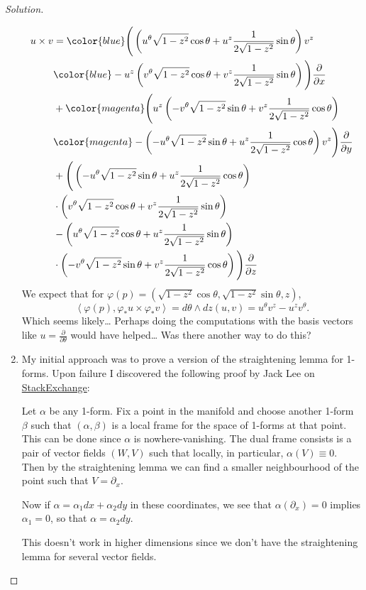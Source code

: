 \begin{proof}[Solution]
\begin{enumerate}[label=\alph*.]
\begin{align*}
				u\times v&={\color{blue}\Bigg(\left( u^\theta \sqrt{1-z^2} \cos \theta+u^z\frac{1}{2\sqrt{1-z^2} }\sin \theta \right)v^z}\\
					 &{\color{blue}-u^z\left( v^\theta \sqrt{1-z^2} \cos \theta+v^z\frac{1}{2\sqrt{1-z^2} }\sin \theta \right) \Bigg)\frac{\partial}{\partial x}}\\
					 &+{\color{magenta}\Bigg(u^z \left( -v^\theta \sqrt{1-z^2} \sin \theta+v^z\frac{1}{2\sqrt{1-z^2} }\cos \theta \right)} \\
					 &{\color{magenta}-\left( -u^\theta \sqrt{1-z^2} \sin \theta+u^z\frac{1}{2\sqrt{1-z^2} }\cos \theta \right) v^z\Bigg)\frac{\partial}{\partial y}}\\
				&+\Bigg(\left( -u^\theta \sqrt{1-z^2} \sin \theta+u^z\frac{1}{2\sqrt{1-z^2} }\cos \theta \right)\\
				&\cdot \left( v^\theta \sqrt{1-z^2} \cos \theta+v^z\frac{1}{2\sqrt{1-z^2} }\sin \theta \right)\\
				&-\left( u^\theta \sqrt{1-z^2} \cos \theta+u^z\frac{1}{2\sqrt{1-z^2} }\sin \theta \right)\\
				&\cdot \left( -v^\theta \sqrt{1-z^2} \sin \theta+v^z\frac{1}{2\sqrt{1-z^2} }\cos \theta \right)\Bigg)\frac{\partial}{\partial z}
			\end{align*}
			We expect that for $\varphi (p)=(\sqrt{1-z^2} \cos \theta,\sqrt{1-z^2} \sin \theta,z)$,
			\[\left<\varphi(p),\varphi_*u\times \varphi_*v\right>=d\theta\wedge dz(u,v)=u^\theta v^z-u^zv^\theta. \]
			Which seems likely… Perhaps doing the computations with the basis vectors like $u=\frac{\partial}{\partial \theta}$ would have helped… Was there another way to do this?

	\item My initial approach was to prove a version of the straightening lemma for 1-forms. Upon failure I discovered the following proof by Jack Lee on \href{https://math.stackexchange.com/questions/1071490/local-expression-for-a-1-form-on-a-surface}{StackExchange}:

		Let $\alpha$ be any 1-form. Fix a point in the manifold and choose another 1-form $\beta$ such that $(\alpha,\beta)$ is a local frame for the space of 1-forms at that point. This can be done since $\alpha$ is nowhere-vanishing. The dual frame consists is a pair of vector fields $(W,V)$ such that locally, in particular, $\alpha(V)\equiv0$. Then by the straightening lemma we can find a smaller neighbourhood of the point such that $V=\partial_x$.

		Now if $\alpha=\alpha_1dx+\alpha_2dy$ in these coordinates, we see that $\alpha(\partial_x)=0$ implies $\alpha_1=0$, so that $\alpha=\alpha_2dy$.

		\begin{remark}
			This doesn't work in higher dimensions since we don't have the straightening lemma for several vector fields.
		\end{remark}
	\end{enumerate}
\end{proof}

\printbibliography


